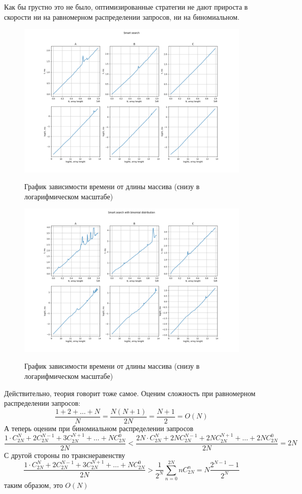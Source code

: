 \documentclass[a4paper, 12pt]{report}
\begin{document}
		Как бы грустно это не было, оптимизированные стратегии не дают прироста в скорости ни на равномерном распределении запросов, ни на биномиальном.
		\begin{figure}[ht!]
			\centering
			{\includegraphics[width=1\linewidth]{./freq_used/smart_search.png}}
			\caption{График зависимости времени от длины массива (снизу в логарифмическом масштабе)}
			\label{fig:freq_used}
		\end{figure}
	
	
		\begin{figure}[ht!]
			\centering
			{\includegraphics[width=1\linewidth]{./freq_used/smart_search_with_binomial.png}}
			\caption{График зависимости времени от длины массива (снизу в логарифмическом масштабе)}
			\label{fig:freq_used_binomial}
		\end{figure}
		Действительно, теория говорит тоже самое. Оценим сложность при равномерном распределении запросов:
		$$\dfrac{1+2+\hdots+N}{N} = \dfrac{N(N+1)}{2N} = \dfrac{N+1}{2} = O(N)$$
		А теперь оценим при биномиальном распределении запросов
		$$ \dfrac{1\cdot C^{N}_{2N} + 2C_{2N}^{N-1} + 3C_{2N}^{N+1} + \hdots + NC_{2N}^0}{2N} < \dfrac{2N\cdot C^{N}_{2N} + 2NC_{2N}^{N-1} + 2NC_{2N}^{N+1} + \hdots + 2NC_{2N}^0}{2N} = 2N $$
		С другой стороны по транснеравенству
		$$ \dfrac{1\cdot C^{N}_{2N} + 2C_{2N}^{N-1} + 3C_{2N}^{N+1} + \hdots + NC_{2N}^0}{2N} > \dfrac{1}{2^N}\sum_{n=0}^{2N}nC_{2N}^n = N\dfrac{2^{N-1} - 1}{2^N}$$
		таким образом, это $O(N)$
\end{document}
